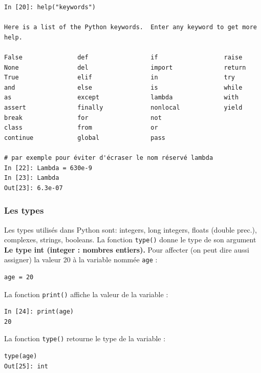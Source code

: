 \documentclass{beamer}
\begin{document}
\begin{frame}

\begin{verbatim}
In [20]: help("keywords")

Here is a list of the Python keywords.  Enter any keyword to get more help.

False               def                 if                  raise
None                del                 import              return
True                elif                in                  try
and                 else                is                  while
as                  except              lambda              with
assert              finally             nonlocal            yield
break               for                 not
class               from                or
continue            global              pass

# par exemple pour éviter d'écraser le nom réservé lambda
In [22]: Lambda = 630e-9
In [23]: Lambda
Out[23]: 6.3e-07
\end{verbatim}
\end{frame}

\begin{frame}
\frametitle{Les types}

Les types utilisés dans Python sont: integers, long integers, floats (double prec.), complexes, strings, booleans. La fonction \texttt{type()} donne le type de son argument
\noindent\textbf{Le type int (integer : nombres entiers).}
Pour affecter (on peut dire aussi assigner) la valeur 20 à la variable nommée \texttt{age} :

\begin{verbatim}
age = 20
\end{verbatim}
La fonction \texttt{print()} affiche la valeur de la variable :

\begin{verbatim}
In [24]: print(age)
20
\end{verbatim}
La fonction \texttt{type()} retourne le type de la variable :
\begin{verbatim}
type(age)
Out[25]: int
\end{verbatim}
\end{frame}
\end{document}
